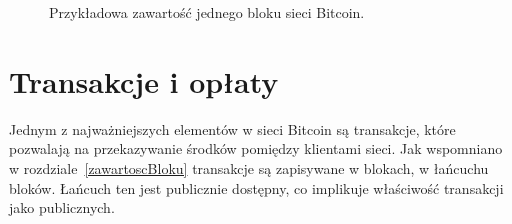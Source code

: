 \documentclass[12pt, twoside, final, openany]{mgr}
\begin{document}
\begin{figure}[H]
	\begin{center}	
	\end{center}
	\caption{Przykładowa zawartość jednego bloku sieci Bitcoin.}
	\label{fig:przykladowyBlok}
\end{figure}
\section{Transakcje i opłaty}
\label{transakcje}

\indent Jednym z najważniejszych elementów w sieci Bitcoin są transakcje, które pozwalają na przekazywanie środków pomiędzy klientami sieci. Jak wspomniano w rozdziale~\ref{zawartoscBloku} transakcje są zapisywane w blokach, w łańcuchu bloków. Łańcuch ten jest publicznie dostępny, co implikuje właściwość transakcji jako publicznych. 
\end{document}
